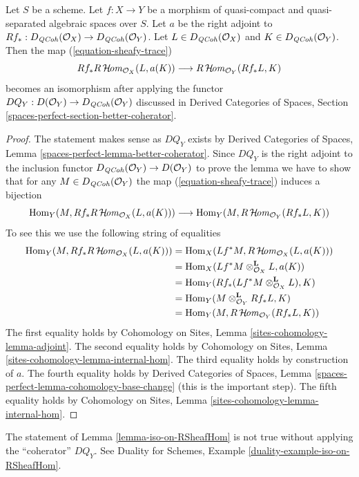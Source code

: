 \begin{lemma}
\label{lemma-iso-on-RSheafHom}
Let $S$ be a scheme.
Let $f : X \to Y$ be a morphism of quasi-compact and quasi-separated
algebraic spaces over $S$.
Let $a$ be the right adjoint to
$Rf_* : D_{\mathit{QCoh}}(\mathcal{O}_X) \to D_{\mathit{QCoh}}(\mathcal{O}_Y)$.
Let $L \in D_{\mathit{QCoh}}(\mathcal{O}_X)$ and
$K \in D_{\mathit{QCoh}}(\mathcal{O}_Y)$.
Then the map (\ref{equation-sheafy-trace})
$$
Rf_*R\mathop{\mathcal{H}\!\mathit{om}}\nolimits_{\mathcal{O}_X}(L, a(K))
\longrightarrow
R\mathop{\mathcal{H}\!\mathit{om}}\nolimits_{\mathcal{O}_Y}(Rf_*L, K)
$$
becomes an isomorphism after applying the functor
$DQ_Y : D(\mathcal{O}_Y) \to D_{\mathit{QCoh}}(\mathcal{O}_Y)$
discussed in Derived Categories of Spaces, Section
\ref{spaces-perfect-section-better-coherator}.
\end{lemma}

\begin{proof}
The statement makes sense as $DQ_Y$ exists by
Derived Categories of Spaces, Lemma
\ref{spaces-perfect-lemma-better-coherator}.
Since $DQ_Y$ is the right adjoint to the inclusion
functor $D_{\mathit{QCoh}}(\mathcal{O}_Y) \to D(\mathcal{O}_Y)$
to prove the lemma we have to show that for any
$M \in D_{\mathit{QCoh}}(\mathcal{O}_Y)$
the map (\ref{equation-sheafy-trace}) induces a bijection
$$
\mathop{\mathrm{Hom}}\nolimits_Y(M, Rf_*R\mathop{\mathcal{H}\!\mathit{om}}\nolimits_{\mathcal{O}_X}(L, a(K)))
\longrightarrow
\mathop{\mathrm{Hom}}\nolimits_Y(M, R\mathop{\mathcal{H}\!\mathit{om}}\nolimits_{\mathcal{O}_Y}(Rf_*L, K))
$$
To see this we use the following string of equalities
\begin{align*}
\mathop{\mathrm{Hom}}\nolimits_Y(M, Rf_*R\mathop{\mathcal{H}\!\mathit{om}}\nolimits_{\mathcal{O}_X}(L, a(K)))
& =
\mathop{\mathrm{Hom}}\nolimits_X(Lf^*M, R\mathop{\mathcal{H}\!\mathit{om}}\nolimits_{\mathcal{O}_X}(L, a(K))) \\
& =
\mathop{\mathrm{Hom}}\nolimits_X(Lf^*M \otimes_{\mathcal{O}_X}^\mathbf{L} L, a(K)) \\
& =
\mathop{\mathrm{Hom}}\nolimits_Y(Rf_*(Lf^*M \otimes_{\mathcal{O}_X}^\mathbf{L} L), K) \\
& =
\mathop{\mathrm{Hom}}\nolimits_Y(M \otimes_{\mathcal{O}_Y}^\mathbf{L} Rf_*L, K) \\
& =
\mathop{\mathrm{Hom}}\nolimits_Y(M, R\mathop{\mathcal{H}\!\mathit{om}}\nolimits_{\mathcal{O}_Y}(Rf_*L, K))
\end{align*}
The first equality holds by Cohomology on Sites, Lemma
\ref{sites-cohomology-lemma-adjoint}.
The second equality holds by Cohomology on Sites, Lemma
\ref{sites-cohomology-lemma-internal-hom}.
The third equality holds by construction of $a$.
The fourth equality holds by Derived Categories of Spaces, Lemma
\ref{spaces-perfect-lemma-cohomology-base-change} (this is the important step).
The fifth equality holds by Cohomology on Sites, Lemma
\ref{sites-cohomology-lemma-internal-hom}.
\end{proof}

\begin{example}
\label{example-iso-on-RSheafHom}
The statement of Lemma \ref{lemma-iso-on-RSheafHom} is not true without
applying the ``coherator'' $DQ_Y$. See
Duality for Schemes, Example \ref{duality-example-iso-on-RSheafHom}.
\end{example}

